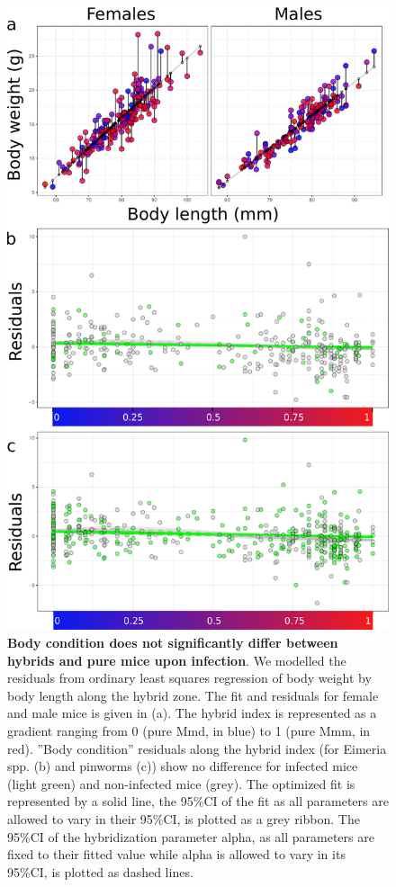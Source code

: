 \begin{figure}[H]
    \centering
    \includegraphics[width=.7\linewidth,height=\textheight,keepaspectratio]{images/2article1/Figure4.pdf}
    \caption{\textbf{Body condition does not significantly differ between hybrids and pure mice upon infection}. We modelled the residuals from ordinary least squares regression of body weight by body length along the hybrid zone. The fit and residuals for female and male mice is given in (a). The hybrid index is represented as a gradient ranging from 0 (pure Mmd, in blue) to 1 (pure Mmm, in red). ”Body condition” residuals along the hybrid index (for Eimeria spp. (b) and pinworms (c)) show no difference for infected mice (light green) and non-infected mice (grey). The optimized fit is represented by a solid line, the 95\%CI of the fit as all parameters are allowed to vary in their 95\%CI, is plotted as a grey ribbon. The 95\%CI of the hybridization parameter alpha, as all parameters are fixed to their fitted value while alpha is allowed to vary in its 95\%CI, is plotted as dashed lines.}
\end{figure}

